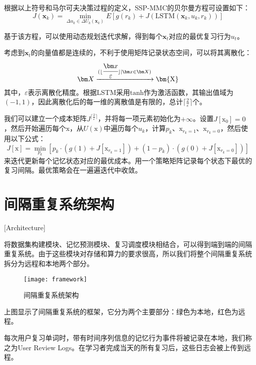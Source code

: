 根据以上符号和马尔可夫决策过程的定义，SSP-MMC的贝尔曼方程可设置如下：
\begin{equation}
J(\bm x_k) = \min\limits_{\Delta u_k \in \Delta U_k(\bm x_k)} E[g(r_k) + J(\mathrm{LSTM}(\bm x_k,u_k,r_k))]
\end{equation}

基于该方程，可以使用动态规划迭代求解，得到每个$\bm x_t$对应的最优复习行为$u_t$。

考虑到$\bm x_t$的向量值都是连续的，不利于使用矩阵记录状态空间，可以将其离散化：
\begin{equation}
\bm X \xrightarrow[]{(\lfloor \cfrac{\bm x}{\varepsilon} \rfloor|\bm x \in \bm X)} \bm{\mathrm{X}}
\end{equation}
其中，$\varepsilon$表示离散化精度。根据LSTM采用$\mathrm{tanh}$作为激活函数，其输出值域为$(-1,1)$，因此离散化后的每一维的离散值是有限的，总计$\lceil\frac{2}{\varepsilon}\rceil$个。

我们可以建立一个成本矩阵$J^{\lceil\frac{2}{\varepsilon}\rceil}$，并将每一项元素初始化为$+\infty$。设置$J[\bm{\mathrm{x_0}}] = 0$，然后开始遍历每个$\bm{\mathrm{x}}$，从$U(\bm{\mathrm{x}})$中遍历每个$u_k$，计算$p_k$、$\bm{\mathrm{x}}_{r_k=1}$、$\bm{\mathrm{x}}_{r_k=0}$，然后使用以下公式：
\begin{equation}
J[\bm{\mathrm{x}}] = \min\limits_{p_k} [p_k \cdot (g(1) + J[\bm{\mathrm{x}}_{r_k=1}]) + (1-p_k) \cdot (g(0) + J[\bm{\mathrm{x}}_{r_k=0}])]
\end{equation}
来迭代更新每个记忆状态对应的最优成本。用一个策略矩阵记录每个状态下最优的复习间隔。最优策略会在一遍遍迭代中收敛。

\section{间隔重复系统架构}[Architecture]

将数据集构建模块、记忆预测模块、复习调度模块相结合，可以得到端到端的间隔重复系统。由于这些模块对存储和算力的要求很高，所以我们将整个间隔重复系统拆分为远程和本地两个部分。

\begin{figure}[htpb]
\centering
\texttt{[image: framework]}
\caption{间隔重复系统架构}
\end{figure}

上图显示了间隔重复系统的框架，它分为两个主要部分：绿色为本地，红色为远程。

每次用户复习单词时，带有时间序列信息的记忆行为事件将被记录在本地，我们称之为User Review Logs。在学习者完成当天的所有复习后，这些日志会被上传到远程。

